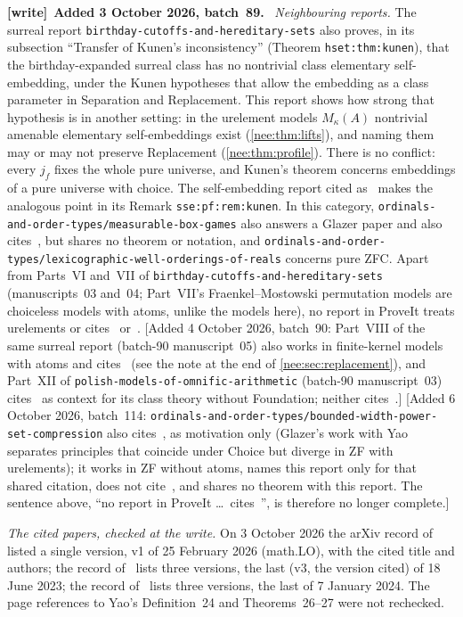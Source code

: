 \documentclass[11pt,letterpaper]{article}
\numberwithin{equation}{section}
\theoremstyle{plain}
\theoremstyle{definition}
\theoremstyle{remark}
\newenvironment{writenote}[1][]{\par\smallskip\begingroup\small\raggedright
 \setlength{\parindent}{1.25em}\noindent\textbf{[write]}\if\relax\detokenize{#1}\relax\else~\textbf{#1.}\fi\ }%
 {\par\endgroup\smallskip}
\begin{document}
\begin{writenote}[Added 3 October 2026, batch~89]
\emph{Neighbouring reports.} The surreal report \nolinkurl{birthday-cutoffs-and-hereditary-sets} also proves, in its subsection ``Transfer of Kunen's inconsistency'' (Theorem \texttt{hset:thm:kunen}), that the birthday-expanded surreal class has no nontrivial class elementary self-embedding, under the Kunen hypotheses that allow the embedding as a class parameter in Separation and Replacement. This report shows how strong that hypothesis is in another setting: in the urelement models $M_\kappa(A)$ nontrivial amenable elementary self-embeddings exist (\cref{nee:thm:lifts}), and naming them may or may not preserve Replacement (\cref{nee:thm:profile}). There is no conflict: every $j_f$ fixes the whole pure universe, and Kunen's theorem concerns embeddings of a pure universe with choice. The self-embedding report cited as~\cite{RepoSSE} makes the analogous point in its Remark \texttt{sse:pf:rem:kunen}. In this category, \nolinkurl{ordinals-and-order-types/measurable-box-games} also answers a Glazer paper and also cites~\cite{G2024}, but shares no theorem or notation, and \nolinkurl{ordinals-and-order-types/lexicographic-well-orderings-of-reals} concerns pure ZFC. Apart from Parts~VI and~VII of \nolinkurl{birthday-cutoffs-and-hereditary-sets} (manuscripts~03 and~04; Part~VII's Fraenkel--Mostowski permutation models are choiceless models with atoms, unlike the models here), no report in ProveIt treats urelements or cites~\cite{GY2026} or~\cite{Yao2023}. [Added 4 October 2026, batch~90: Part~VIII of the same surreal report (batch-90 manuscript~05) also works in finite-kernel models with atoms and cites~\cite{GY2026} (see the note at the end of \cref{nee:sec:replacement}), and Part~XII of \nolinkurl{polish-models-of-omnific-arithmetic} (batch-90 manuscript~03) cites~\cite{GY2026} as context for its class theory without Foundation; neither cites~\cite{Yao2023}.] [Added 6 October 2026, batch~114: \nolinkurl{ordinals-and-order-types/bounded-width-power-set-compression} also cites~\cite{GY2026}, as motivation only (Glazer's work with Yao separates principles that coincide under Choice but diverge in ZF with urelements); it works in ZF without atoms, names this report only for that shared citation, does not cite~\cite{Yao2023}, and shares no theorem with this report. The sentence above, ``no report in ProveIt \dots\ cites~\cite{GY2026}'', is therefore no longer complete.]

\emph{The cited papers, checked at the write.} On 3 October 2026 the arXiv record of~\cite{GY2026} listed a single version, v1 of 25 February 2026 (math.LO), with the cited title and authors; the record of~\cite{Yao2023} lists three versions, the last (v3, the version cited) of 18 June 2023; the record of~\cite{G2024} lists three versions, the last of 7 January 2024. The page references to Yao's Definition~24 and Theorems~26--27 were not rechecked.
\end{writenote}
\end{document}
